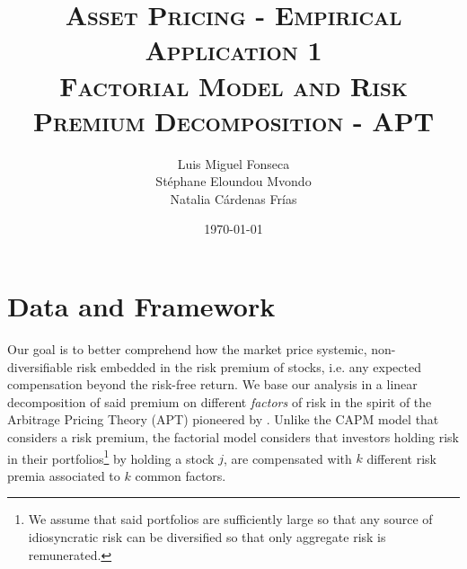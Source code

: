 \documentclass[hidelinks,11pts]{article}
\DeclareMathOperator{\1}{\mathbbm{1}}
\begin{document}
        \title{\scshape{Asset Pricing - Empirical Application 1\\Factorial Model and Risk Premium Decomposition - APT }}%
        \author{Luis Miguel Fonseca \\ Stéphane Eloundou Mvondo\\ Natalia Cárdenas Frías }
        \date{\today}
        \maketitle 






\section{Data and Framework}

Our goal is to better comprehend how the market price systemic, non-diversifiable risk embedded in the risk premium of stocks, i.e. any expected compensation beyond the risk-free return.
We base our analysis in a linear decomposition of said premium on different \emph{factors} of risk in the spirit of the Arbitrage Pricing Theory (APT) pioneered by \cite{rossArbitrageTheoryCapital1976}. 
Unlike the CAPM model that considers a risk premium, the factorial model considers that investors holding risk in their portfolios\footnote{We assume that said portfolios are sufficiently large so that any source of idiosyncratic risk can be diversified so that only aggregate risk is remunerated.} by holding a stock $j$, are compensated with $k$ different risk premia associated to $k$ common factors.%
\end{document}

